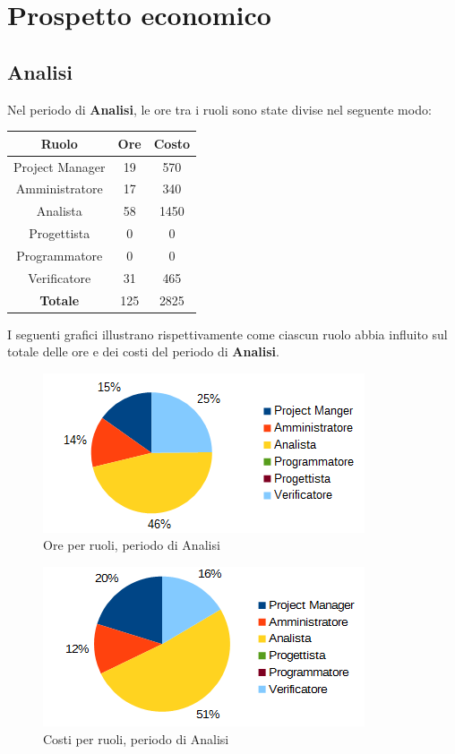 \section{Prospetto economico}
	\subsection{Analisi}
	Nel periodo di \textbf{Analisi}, le ore tra i ruoli sono state divise nel seguente modo: \\
	\begin{table}[H]
		\centering
		\begin{tabular}{|c|c|c|}
			\hline
			\textbf{Ruolo}		& \textbf{Ore}	& \textbf{Costo} \\
			\hline
			Project Manager		& 19			& 570	\\
			Amministratore		& 17			& 340	\\
			Analista			& 58			& 1450	\\
			Progettista			& 0				& 0	\\
			Programmatore		& 0				& 0	\\
			Verificatore		& 31			& 465	\\
			\hline
			\textbf{Totale}		& 125			& 2825	\\
			\hline
		\end{tabular}
		\end{table}
	I seguenti grafici illustrano rispettivamente come ciascun ruolo abbia influito sul totale
delle ore e dei costi del periodo di \textbf{Analisi}. \\
	\begin{figure}[H]
		\centering
		\includegraphics[width=1\linewidth]{immagini/grafici/analisi-torta.png}
		\caption{Ore per ruoli, periodo di Analisi}
	\end{figure}
	\begin{figure}[H]
		\centering
		\includegraphics[width=1\linewidth]{immagini/grafici/analisi-torta-costo.png}
		\caption{Costi per ruoli, periodo di Analisi}
	\end{figure}
